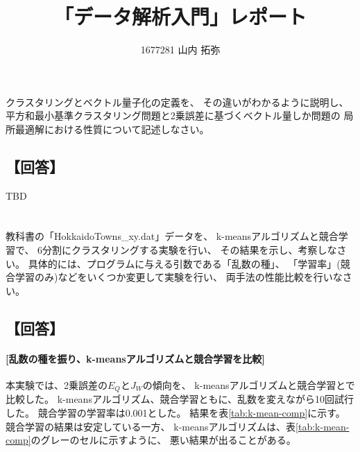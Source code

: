 \documentclass[a4j]{jarticle}
\title{「データ解析入門」レポート}
\author{1677281 山内 拓弥}
\begin{document}
\maketitle

\section{}
クラスタリングとベクトル量子化の定義を、
その違いがわかるように説明し、
平方和最小基準クラスタリング問題と2乗誤差に基づくベクトル量しか問題の
局所最適解における性質について記述しなさい。

\subsection{【回答】}
TBD

\section{}
教科書の「HokkaidoTowns\_xy\@.dat」データを、 k-meansアルゴリズムと競合学習で、
6分割にクラスタリングする実験を行い、 その結果を示し、考察しなさい。
具体的には、プログラムに与える引数である「乱数の種」、
「学習率」(競合学習のみ)などをいくつか変更して実験を行い、
両手法の性能比較を行いなさい。

\subsection{【回答】}

\paragraph{[乱数の種を振り、k-meansアルゴリズムと競合学習を比較]}
本実験では、2乗誤差の$E_Q$と$J_W$の傾向を、
k-meansアルゴリズムと競合学習とで比較した。
k-meansアルゴリズム、競合学習ともに、乱数を変えながら10回試行した。
競合学習の学習率は0.001とした。
結果を表\ref{tab:k-mean-comp}に示す。
競合学習の結果は安定している一方、
k-meansアルゴリズムは、表\ref{tab:k-mean-comp}のグレーのセルに示すように、
悪い結果が出ることがある。
\end{document}
